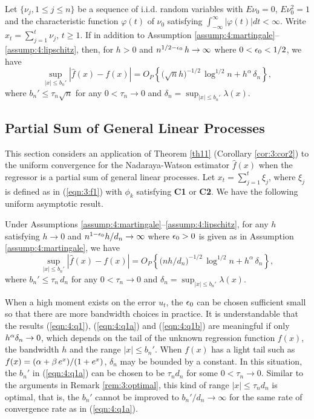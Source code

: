 \begin{cor} 
Let  $\{\nu_{j}, 1 \le j\le n \}$ be a sequence of i.i.d.
random variables with $E\nu_{0}=0$, $E\nu _{0}^{2}=1$ and the
characteristic function $\varphi (t)$ of $\nu_{0}$ satisfying
$\int_{-\infty }^{\infty }|\varphi (t)|dt<\infty $. Write $x_t=\sum_{j=1}^t\nu_j$, $t\ge 1$. If in addition to Assumption \ref{assump:4:martingale}--\ref{assump:4:lipschitz}, then,  for  $h> 0$  and $n^{1/2-\epsilon_0}\, h\to \infty$ where $0<\epsilon_0<1/2$, we have
\begin{equation}
\sup_{|x|\le b_n'}|\widehat{f}(x)-f(x)|=
O_{P}\left\{\big(\sqrt{n}h\big)^{-1/2}\,\log^{1/2}n
+h^{\alpha}\, \delta_n\right\},
\label{eqn:4:q1a}\end{equation}
where $b_n'\le \tau_n\sqrt n$ for any $0<\tau_n\to 0$ and $\delta_n=\sup_{|x|\le b_n'}\lambda(x)$.
\end{cor}

\subsection{Partial Sum of General Linear Processes}

This section considers an application of Theorem \ref{th11} (Corollary \ref{cor:3:cor2}) to the uniform convergence for the Nadaraya-Watson estimator $\widehat{f}(x)$ when the regressor is a partial sum of general linear processes. Let $x_t=\sum_{j=1}^t\xi_j$, where $\xi_j$ is defined as in (\ref {eqn:3:f1}) with $\phi_k$ satisfying {\bf C1} or {\bf C2}. We have the following uniform asymptotic result.

\begin{thm}  Under Assumptions \ref{assump:4:martingale}--\ref{assump:4:lipschitz},
for any $h$ satisfying $h\to 0$ and $n^{1-\epsilon_0}h/d_n\to \infty$ where $\epsilon_0>0$ is given as in Assumption \ref{assump:4:martingale}, we have
\begin{equation} 
\sup_{|x|\le b_n'}|\widehat{f}(x)-f(x)|=
O_{P}\left\{\big(nh/d_n\big)^{-1/2}\,\log^{1/2}n
+h^{\alpha}\, \delta_n\right\},
\label{eqn:4:q1b}\end{equation}
where $b_n'\le \tau_n\,d_n $ for any  $0<\tau_n \to 0$ and $\delta_n=\sup_{|x|\le b_n'}\lambda(x)$.
\end{thm}


\begin{rem} When a high moment exists on the error $u_t$,
the $\epsilon_0$ can be chosen sufficient small so that there are more bandwidth choices  in practice. It is understandable that the results (\ref {eqn:4:q1}), (\ref {eqn:4:q1a}) and (\ref {eqn:4:q1b}) are meaningful if only $h^{\alpha}\delta_n\to 0$, which depends on the tail of the unknown regression function $f(x)$, the bandwidth $h$ and the range $|x|\le b_n'$.
When $f(x)$ has a light tail such as $f(x)=(\alpha+\beta\, e^{x})/(1+e^x)$, $\delta_n$ may be bounded by a constant. In this situation, the $b_n'$ in (\ref {eqn:4:q1a}) can be chosen to be $\tau_n d_n$ for some $0<\tau_n\to 0$. Similar to the arguments in Remark \ref{rem:3:optimal}, this kind of range $|x|\le \tau_n d_n$ is optimal, that is, the $b_n'$ cannot be improved  to $b_n' / d_n \to \infty$ for the same rate of convergence rate as in (\ref {eqn:4:q1a}).
\end{rem}

